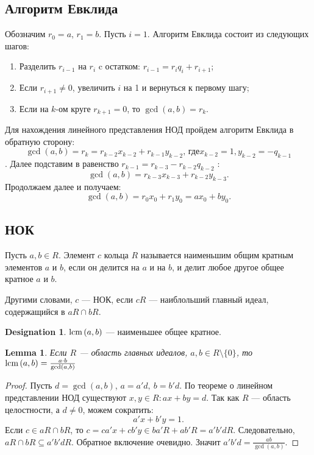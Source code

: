 \documentclass[11pt]{book}
\newcommand{\lcm}{{\mathop{\text{\rm lcm}}\,}}
\theoremstyle{definition}
\theoremstyle{plain}
\theoremstyle{plain}
\newtheorem{lm}{Lemma}
\theoremstyle{definition}
\newtheorem*{name}{Designation}
\theoremstyle{remark}
\begin{document}
\subsection{Алгоритм Евклида}
Обозначим $ r_0 = a$, $ r_1 = b$. Пусть $ i = 1$. Алгоритм Евклида состоит из следующих шагов:
\begin{enumerate}[noitemsep]
    \item Разделить $ r_{i-1} $ на $ r_i$ c остатком:  $ r_{i-1} = r_i q_i + r_{i+1}$;
    \item Если $ r_{i+1} \ne  0$, увеличить $ i $ на 1 и вернуться к первому шагу;
    \item Если на $ k$-ом  круге $ r_{k+1} = 0$, то $ \gcd(a, b) = r_k$.
\end{enumerate}
Для нахождения линейного представления НОД пройдем алгоритм Евклида в обратную сторону: $$ \gcd(a, b) = r_k = r_{k-2}x_{k-2} + r_{k-1}y_{k-2} \text{, где}  x_{k-2} = 1, y_{k-2} = - q_{k-1}$$. Далее подставим в равенство  $ r_{k-1} = r_{k-3}-r_{k-2}q_{k-2}$ :
\[
    \gcd(a, b) = r_{k-3}x_{k-3}+ r_{k-2}y_{k-3}
.\] 
Продолжаем далее и получаем:
\[
    \gcd(a, b) = r_0x_0 + r_1y_0 = ax_0 + by_0
.\] 
\subsection{НОК}
 \begin{defn}
     Пусть $ a, b \in R$. Элемент $ c$ кольца  $ R$ называется {\sf наименьшим общим кратным} элементов  $ a$ и  $ b$, если он делится на $ a$ и на $ b$, и делит любое другое общее кратное $ a$ и  $ b$.

     Другими словами, $ c $ --- НОК, если  $ cR$ --- наиблольший главный идеал, содержащийся в  $ aR \cap bR$.
     \begin{name}
	 $ \lcm(a, b)$ --- наименьшее общее кратное.
     \end{name}
 \end{defn}
 \begin{lm}
     Если $ R$ --- область главных идеалов,  $ a, b \in R \setminus \{0\}$, то
     $ \lcm(a, b) = \frac{a \cdot b}{\gcd(a, b)}$
 \end{lm}
 \begin{proof}
     Пусть $ d = \gcd(a, b)$,  $ a = a'd, ~ b= b'd$. По теореме о линейном представлении НОД существуют  $ x, y \in R: ax + by = d$. Так как $ R$ --- область целостности, а $ d \ne  0$, можем сократить:
      \[
      a'x + b'y = 1
      .\] 
      Если $ c \in aR \cap  bR$, то $ c = ca'x + c b'y \in ba'R + ab'R = a'b'dR$. Следовательно, $ aR \cap bR \subseteq a'b'dR$. Обратное включение очевидно. Значит $ a'b'd = \frac{ab}{\gcd(a, b)}$.
 \end{proof}
\end{document}

